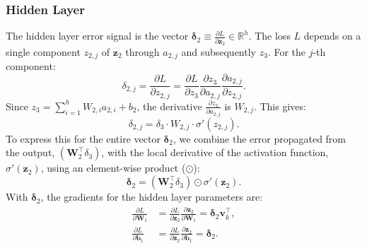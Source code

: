 \documentclass[%
  reprint,
  superscriptaddress,
  showpacs,
  showkeys,
  amsmath,amssymb,
  pra,
  longbibliography,
  floatfix,
  x11names
]{revtex4-2}
\begin{document}
\subsubsection{Hidden Layer}
The hidden layer error signal is the vector $\bm{\delta}_2 \equiv \frac{\partial L}{\partial \bm{z}_2} \in \mathbb{R}^h$. The loss $L$ depends on a single component $z_{2,j}$ of $\bm{z}_2$ through $a_{2,j}$ and subsequently $z_3$. For the $j$-th component:
\begin{equation}
\delta_{2,j} = \frac{\partial L}{\partial z_{2,j}} = \frac{\partial L}{\partial z_3} \frac{\partial z_3}{\partial a_{2,j}} \frac{\partial a_{2,j}}{\partial z_{2,j}}.
\end{equation}
Since $z_3 = \sum_{i=1}^h W_{2,i}a_{2,i} + b_2$, the derivative $\frac{\partial z_3}{\partial a_{2,j}}$ is $W_{2,j}$. This gives:
\begin{equation}
\delta_{2,j} = \delta_3 \cdot W_{2,j} \cdot \sigma'(z_{2,j}).
\end{equation}
To express this for the entire vector $\bm{\delta}_2$, we combine the error propagated from the output, $(\bm{W}_2^\intercal \delta_3)$, with the local derivative of the activation function, $\sigma'(\bm{z}_2)$, using an element-wise product ($\odot$):
\begin{equation}
\bm{\delta}_2 = (\bm{W}_2^\intercal \delta_3) \odot \sigma'(\bm{z}_2).
\end{equation}
With $\bm{\delta}_2$, the gradients for the hidden layer parameters are:
\begin{align}
\frac{\partial L}{\partial \bm{W}_1} &= \frac{\partial L}{\partial \bm{z}_2} \frac{\partial \bm{z}_2}{\partial \bm{W}_1} = \bm{\delta}_2 \bm{v}_k^\intercal, \\
\frac{\partial L}{\partial \bm{b}_1} &= \frac{\partial L}{\partial \bm{z}_2} \frac{\partial \bm{z}_2}{\partial \bm{b}_1} = \bm{\delta}_2.
\end{align}
\end{document}

